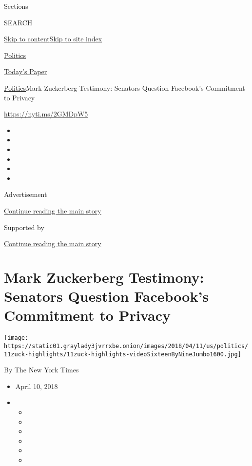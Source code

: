 Sections

SEARCH

\protect\hyperlink{site-content}{Skip to
content}\protect\hyperlink{site-index}{Skip to site index}

\href{https://www.nytimes3xbfgragh.onion/section/politics}{Politics}

\href{https://myaccount.nytimes3xbfgragh.onion/auth/login?response_type=cookie\&client_id=vi}{}

\href{https://www.nytimes3xbfgragh.onion/section/todayspaper}{Today's
Paper}

\href{/section/politics}{Politics}\textbar{}Mark Zuckerberg Testimony:
Senators Question Facebook's Commitment to Privacy

\href{https://nyti.ms/2GMDpW5}{https://nyti.ms/2GMDpW5}

\begin{itemize}
\item
\item
\item
\item
\item
\item
\end{itemize}

Advertisement

\protect\hyperlink{after-top}{Continue reading the main story}

Supported by

\protect\hyperlink{after-sponsor}{Continue reading the main story}

\hypertarget{mark-zuckerberg-testimony-senators-question-facebooks-commitment-to-privacy}{%
\section{Mark Zuckerberg Testimony: Senators Question Facebook's
Commitment to
Privacy}\label{mark-zuckerberg-testimony-senators-question-facebooks-commitment-to-privacy}}

\texttt{[image: https://static01.graylady3jvrrxbe.onion/images/2018/04/11/us/politics/11zuck-highlights/11zuck-highlights-videoSixteenByNineJumbo1600.jpg]}

By The New York Times

\begin{itemize}
\item
  April 10, 2018
\item
  \begin{itemize}
  \item
  \item
  \item
  \item
  \item
  \item
  \end{itemize}
\end{itemize}

